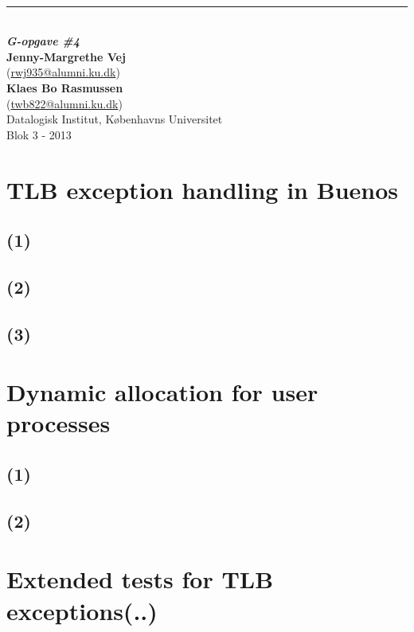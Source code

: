 \thispagestyle{empty}
\begin{flushright}
   {\Huge\textbf{\@title}}\\[3mm]
   \rule{\linewidth}{2mm}\\[3mm]
   {\Large\textbf{\textit{G-opgave \#4}}}\\
   \vspace{12cm}
   {\normalsize \textbf{Jenny-Margrethe Vej}
   \\(\url{rwj935@alumni.ku.dk})}
   \\
   {\normalsize \textbf{Klaes Bo Rasmussen}
   \\(\url{twb822@alumni.ku.dk})}
   \\
	\vspace*{2cm}
   {\normalsize Datalogisk Institut, Københavns Universitet}\\
   {\normalsize Blok 3 - 2013}\\
\end{flushright}
\clearpage

\section*{TLB exception handling in Buenos}
\subsection*{(1)}

\subsection*{(2)}

\subsection*{(3)}

\section*{Dynamic allocation for user processes}
\subsection*{(1)}

\subsection*{(2)}

\section*{Extended tests for TLB exceptions(..)}


%



